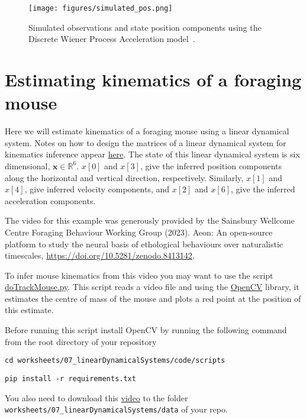 \documentclass[12pt]{article}
\begin{document}
\begin{figure}[h]
	\begin{center}
		\texttt{[image: figures/simulated\_pos.png]}
		\label{fig:simulated_pos}
		\caption{Simulated observations and state position components
              using the Discrete Wiener Process Acceleration
              model~\citep[][Section 6.3.3]{barShalomEtAl04}.}
	\end{center}
\end{figure}

\section{Estimating kinematics of a foraging mouse}

Here we will estimate kinematics of a foraging mouse using a linear dynamical
system. Notes on how to design the matrices of a linear dynamical system for
kinematics inference appear
\href{https://github.com/joacorapela/lds_python/blob/master/docs/tracking/tracking.pdf}{here}.
The state of this linear dynamical system is six dimensional,
$\mathbf{x}\in\mathbb{R}^6$. $x[0]$ and $x[3]$, give the inferred
position components along the horizontal and vertical direction, respectively.
Similarly, $x[1]$ and $x[4]$, give inferred velocity components, and $x[2]$ and
$x[6]$, give the inferred acceleration components.

The video for this example was generously provided by the
Sainsbury Wellcome Centre Foraging Behaviour Working Group (2023). Aeon: An
open-source platform to study the neural basis of ethological behaviours over
naturalistic timescales, \url{https://doi.org/10.5281/zenodo.8413142}.

To infer mouse kinematics from this video you may want to use the script
\href{https://github.com/joacorapela/neuroinformatics24/blob/master/worksheets/07_linearDynamicalSystems/code/scripts/doTrackMouse.py}{doTrackMouse.py}.
This script reads a video file and using the \href{https://opencv.org/}{OpenCV}
library, it estimates the centre of mass
of the mouse and plots a red point at the position of this estimate.

Before running this script install OpenCV by running the following command from the
root directory of your repository

\noindent\texttt{cd worksheets/07\_linearDynamicalSystems/code/scripts}

\noindent\texttt{pip install -r requirements.txt}

You also need to download this
\href{https://www.gatsby.ucl.ac.uk/~rapela/neuroinformatics/2024/worksheets/linearDynamicalSystems/videos/raw/FrameTop_2021-06-03T17-00-00_end001000.avi}{video}
to the folder \texttt{worksheets/07\_linearDynamicalSystems/data} of your repo.
\end{document}
